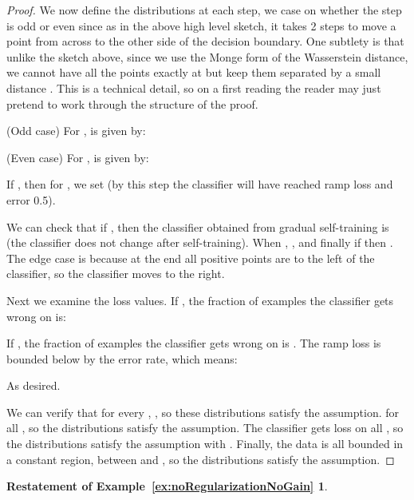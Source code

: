 \documentclass[11pt]{article}
\begin{document}
\begin{proof}
We now define the distributions at each step, we case on whether the step is odd or even since as in the above high level sketch, it takes 2 steps to move a point from  across to the other side of the decision boundary.
One subtlety is that unlike the sketch above, since we use the Monge form of the Wasserstein distance, we cannot have all the points exactly at  but keep them separated by a small distance .
This is a technical detail, so on a first reading the reader may just pretend  to work through the structure of the proof.

(Odd case) For ,  is given by:


(Even case) For ,  is given by:


If , then for , we set  (by this step the classifier will have reached ramp loss and error 0.5).

We can check that if , then the classifier obtained from gradual self-training is  (the classifier does not change after self-training).
When , , and finally if  then .
The edge case is because at the end all positive points are to the left of the classifier, so the classifier moves to the right.

Next we examine the loss values.
If , the fraction of examples the classifier  gets wrong on  is:

If , the fraction of examples the classifier  gets wrong on  is .
The ramp loss is bounded below by the error rate, which means:

As desired.

We can verify that for every , , so these distributions satisfy the \gradShiftAssump{} assumption.
 for all , so the distributions satisfy the \noLabShiftAssump{} assumption.
The classifier  gets  loss on all , so the distributions satisfy the \sepAssump{} assumption with .
Finally, the data is all bounded in a constant region, between  and , so the distributions satisfy the \boundedAssump{} assumption.
\end{proof}



\newtheorem*{noRegularizationNoGainExample}{Restatement of Example~\ref{ex:noRegularizationNoGain}}

\begin{noRegularizationNoGainExample}
\noRegularizationNoGainText{}
\end{noRegularizationNoGainExample}
\end{document}
